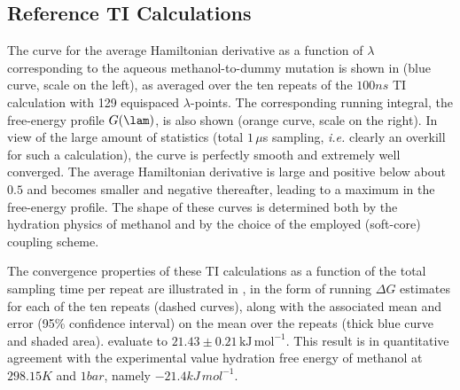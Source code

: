 \subsection{Reference TI Calculations}

The curve for the average Hamiltonian derivative as a function of $\lambda$
corresponding to the aqueous methanol-to-dummy mutation is shown in  (blue curve, scale on the left),
as averaged over the ten repeats of the $100\unit{ns}$ TI calculation 
with 129 equispaced $\lambda$-points.
The corresponding running integral, \ie{} the free-energy profile $G(\lam)$, is also shown (orange curve, scale on the right).
%
In view of the large amount of statistics (total  $1\,\mu$s sampling,
{\em i.e.} clearly an overkill for such a calculation), the curve 
is perfectly smooth and extremely well converged.
%
The average Hamiltonian derivative is large and positive below about $0.5$ and
becomes smaller and negative thereafter, leading to a maximum in
the free-energy profile. The shape of these curves is determined
both by the hydration physics of methanol and by the choice of
the employed (soft-core) coupling scheme.
%

The convergence properties of these TI calculations
as a function of
the total sampling time per repeat are illustrated in ,
in the form of running $\Delta G$ estimates for each of the
ten repeats (dashed curves), along with the associated 
mean and error (95\% confidence interval) on the mean over the repeats (thick blue curve and shaded area).
%
evaluate to $21.43 \pm 0.21\,\mathrm{kJ}\,\mathrm{mol}^{-1}$.
This result  is in quantitative agreement with the experimental value 
 hydration free 
energy of methanol at $298.15\unit{K}$ and $1\unit{bar}$, namely\cite{CA81.1} $-21.4\unit{kJ\,mol^{-1}}$.



